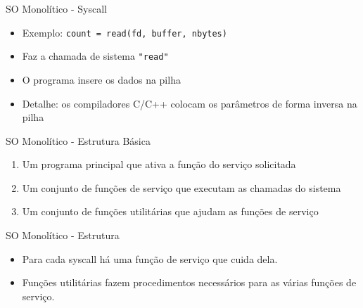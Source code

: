 \documentclass{beamer}
\begin{document}
\begin{frame}{SO Monolítico - Syscall}
    \begin{itemize}
        \item Exemplo: \texttt{count = read(fd, buffer, nbytes)}
        \item Faz a chamada de sistema \texttt{"read"}
        \item O programa insere os dados na pilha
        \item Detalhe: os compiladores C/C++ colocam os parâmetros de forma inversa na pilha
    \end{itemize}
\end{frame}
\begin{frame}{SO Monolítico - Estrutura Básica}
    \begin{enumerate}
        \item Um programa principal que ativa a função do serviço solicitada
        \item Um conjunto de funções de serviço que executam as chamadas do sistema
        \item Um conjunto de funções utilitárias que ajudam as funções de serviço
    \end{enumerate}
\end{frame}

\begin{frame}{SO Monolítico - Estrutura}
    \begin{itemize}
        \item Para cada syscall há uma função de serviço que cuida dela.
        \item Funções utilitárias fazem procedimentos necessários para as várias funções de serviço.
    \end{itemize}
\end{frame}
\end{document}
